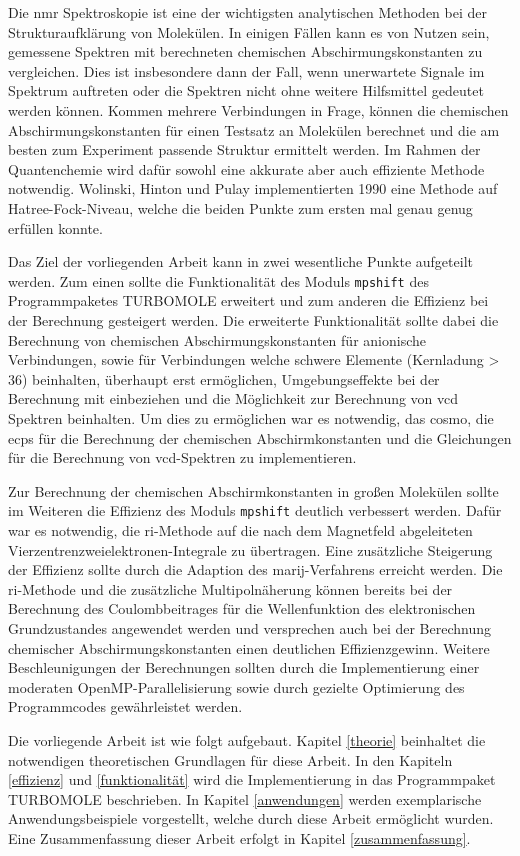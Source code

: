 Die \ac{nmr} Spektroskopie ist eine der wichtigsten analytischen Methoden bei der Strukturaufklärung von Molekülen. In einigen Fällen kann es von Nutzen sein, gemessene Spektren mit berechneten chemischen Abschirmungskonstanten zu vergleichen. Dies ist insbesondere dann der Fall, wenn unerwartete Signale im Spektrum auftreten oder die Spektren nicht ohne weitere Hilfsmittel gedeutet werden können. Kommen mehrere Verbindungen in Frage, können die chemischen Abschirmungskonstanten für einen Testsatz an Molekülen berechnet und die am besten zum Experiment passende Struktur ermittelt werden. Im Rahmen der Quantenchemie wird dafür sowohl eine akkurate aber auch effiziente Methode notwendig. Wolinski, Hinton und Pulay\supercite{wolinski1990efficient} implementierten 1990 eine Methode auf Hatree-Fock-Niveau, welche die beiden Punkte zum ersten mal genau genug erfüllen konnte. 

Das Ziel der vorliegenden Arbeit kann in zwei wesentliche Punkte aufgeteilt werden. Zum einen sollte die Funktionalität des Moduls \texttt{mpshift}\supercite{haser1992direct,kollwitz1996direct} des Programmpaketes \textsc{TURBOMOLE}\supercite{ahlrichs1989electronic,TURBOMOLE,furche2014turbomole} erweitert und zum anderen die Effizienz bei der Berechnung gesteigert werden. Die erweiterte Funktionalität sollte dabei die Berechnung von chemischen Abschirmungskonstanten für anionische Verbindungen, sowie für Verbindungen welche schwere Elemente (Kernladung > 36) beinhalten, überhaupt erst ermöglichen, Umgebungseffekte bei der Berechnung mit einbeziehen und die Möglichkeit zur Berechnung von \ac{vcd} Spektren beinhalten. Um dies zu ermöglichen war es notwendig, das \ac{cosmo},\supercite{klamt1993cosmo} die \acp{ecp} für die Berechnung der chemischen Abschirmkonstanten und die Gleichungen für die Berechnung von \ac{vcd}-Spektren zu implementieren. 

Zur Berechnung der chemischen Abschirmkonstanten in großen Molekülen sollte im Weiteren die Effizienz des Moduls \texttt{mpshift} deutlich verbessert werden. Dafür war es notwendig, die \ac{ri}-Methode auf die nach dem Magnetfeld abgeleiteten Vierzentrenzweielektronen-Integrale zu übertragen. Eine zusätzliche Steigerung der Effizienz sollte durch die Adaption des \ac{marij}-Verfahrens erreicht werden. Die \ac{ri}-Methode und die zusätzliche Multipolnäherung können bereits bei der Berechnung des Coulombbeitrages für die Wellenfunktion des elektronischen Grundzustandes angewendet werden und versprechen auch bei der Berechnung chemischer Abschirmungskonstanten einen deutlichen Effizienzgewinn. Weitere Beschleunigungen der Berechnungen sollten durch die Implementierung einer moderaten OpenMP-Parallelisierung sowie durch gezielte Optimierung des Programmcodes gewährleistet werden. 

\bigskip
Die vorliegende Arbeit ist wie folgt aufgebaut. Kapitel \ref{theorie} beinhaltet die notwendigen theoretischen Grundlagen für diese Arbeit. In den Kapiteln \ref{effizienz} und \ref{funktionalität} wird die Implementierung in das Programmpaket \textsc{TURBOMOLE} beschrieben. In Kapitel \ref{anwendungen} werden exemplarische Anwendungsbeispiele vorgestellt, welche durch diese Arbeit ermöglicht wurden. Eine Zusammenfassung dieser Arbeit erfolgt in Kapitel \ref{zusammenfassung}.